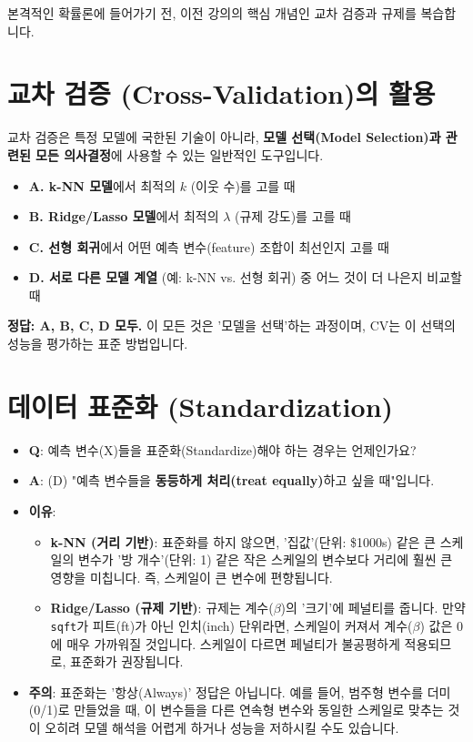\documentclass[11pt,a4paper]{book}
\theoremstyle{definition}
\begin{document}
본격적인 확률론에 들어가기 전, 이전 강의의 핵심 개념인 교차 검증과 규제를 복습합니다.

\section{교차 검증 (Cross-Validation)의 활용}

\begin{tcolorbox}[colback=green!5!white, colframe=green!60!black, title={Q: 교차 검증(CV)은 언제 사용하나요?}]
교차 검증은 특정 모델에 국한된 기술이 아니라, \textbf{모델 선택(Model Selection)과 관련된 모든 의사결정}에 사용할 수 있는 일반적인 도구입니다.

\begin{itemize}
    \item \textbf{A. k-NN 모델}에서 최적의 $k$ (이웃 수)를 고를 때
    \item \textbf{B. Ridge/Lasso 모델}에서 최적의 $\lambda$ (규제 강도)를 고를 때
    \item \textbf{C. 선형 회귀}에서 어떤 예측 변수(feature) 조합이 최선인지 고를 때
    \item \textbf{D. 서로 다른 모델 계열} (예: k-NN vs. 선형 회귀) 중 어느 것이 더 나은지 비교할 때
\end{itemize}
\textbf{정답: A, B, C, D 모두.} 이 모든 것은 '모델을 선택'하는 과정이며, CV는 이 선택의 성능을 평가하는 표준 방법입니다.
\end{tcolorbox}

\section{데이터 표준화 (Standardization)}

\begin{itemize}
    \item \textbf{Q}: 예측 변수(X)들을 표준화(Standardize)해야 하는 경우는 언제인가요?
    \item \textbf{A}: (D) "예측 변수들을 \textbf{동등하게 처리(treat equally)}하고 싶을 때"입니다.
    \item \textbf{이유}:
        \begin{itemize}
            \item \textbf{k-NN (거리 기반)}: 표준화를 하지 않으면, '집값'(단위: \$1000s) 같은 큰 스케일의 변수가 '방 개수'(단위: 1) 같은 작은 스케일의 변수보다 거리에 훨씬 큰 영향을 미칩니다. 즉, 스케일이 큰 변수에 편향됩니다.
            \item \textbf{Ridge/Lasso (규제 기반)}: 규제는 계수($\beta$)의 '크기'에 페널티를 줍니다. 만약 \texttt{sqft}가 피트(ft)가 아닌 인치(inch) 단위라면, 스케일이 커져서 계수($\beta$) 값은 0에 매우 가까워질 것입니다. 스케일이 다르면 페널티가 불공평하게 적용되므로, 표준화가 권장됩니다.
        \end{itemize}
    \item \textbf{주의}: 표준화는 '항상(Always)' 정답은 아닙니다. 예를 들어, 범주형 변수를 더미(0/1)로 만들었을 때, 이 변수들을 다른 연속형 변수와 동일한 스케일로 맞추는 것이 오히려 모델 해석을 어렵게 하거나 성능을 저하시킬 수도 있습니다.
\end{itemize}
\end{document}
